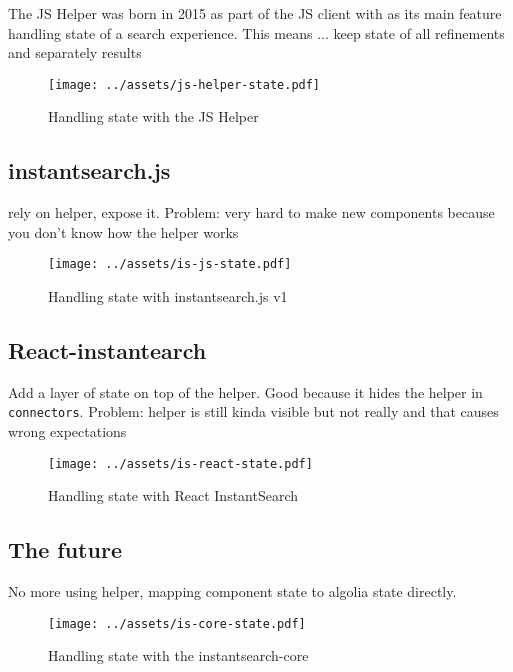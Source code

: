 The JS Helper was born in 2015 as part of the JS client\cite{algolia-blog-js-client} with as its main feature handling state of a search experience. This means ... keep state of all refinements and separately results

\begin{figure}[H]
  \label{figure:company-logo}
  \centering
  \texttt{[image: ../assets/js-helper-state.pdf]}
  \caption{Handling state with the JS Helper}
\end{figure}


\subsection{instantsearch.js} %
\label{sub:instantsearch_js}

rely on helper, expose it. Problem: very hard to make new components because you don't know how the helper works

\begin{figure}[H]
  \label{figure:company-logo}
  \centering
  \texttt{[image: ../assets/is-js-state.pdf]}
  \caption{Handling state with instantsearch.js v1}
\end{figure}


\subsection{React-instantearch} %
\label{sub:react_instantearch}

Add a layer of state on top of the helper. Good because it hides the helper in {\tt connectors}. Problem: helper is still kinda visible but not really and that causes wrong expectations

\begin{figure}[H]
  \label{figure:company-logo}
  \centering
  \texttt{[image: ../assets/is-react-state.pdf]}
  \caption{Handling state with React InstantSearch}
\end{figure}


\subsection{The future} %
\label{sub:the_future}

No more using helper, mapping component state to algolia state directly.

\begin{figure}[H]
  \label{figure:company-logo}
  \centering
  \texttt{[image: ../assets/is-core-state.pdf]}
  \caption{Handling state with the instantsearch-core}
\end{figure}


